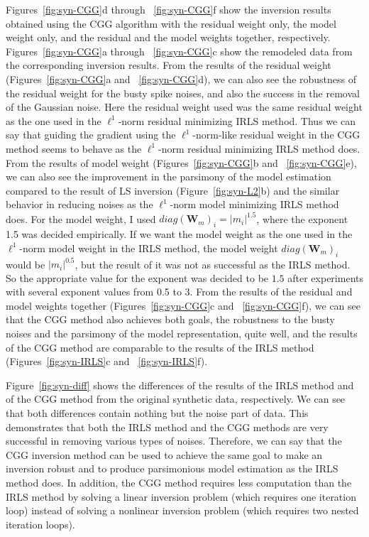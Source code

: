 Figures~\ref{fig:syn-CGG}d through ~\ref{fig:syn-CGG}f show the inversion results 
obtained using the CGG algorithm with the residual weight only,
the model weight only, and the residual and the model weights together, respectively.  
Figures~\ref{fig:syn-CGG}a through ~\ref{fig:syn-CGG}c show the remodeled data 
from the corresponding inversion results.
From the results of the residual weight (Figures~\ref{fig:syn-CGG}a and ~\ref{fig:syn-CGG}d),
we can also see the robustness of the residual weight for the busty spike noises,
and also the success in the removal of the Gaussian noise.
Here the residual weight used was the same residual weight as the one used
in the $\ell^1$-norm residual minimizing IRLS method.
Thus we can say that guiding the gradient using the $\ell^1$-norm-like residual weight 
in the CGG method seems to behave as the $\ell^1$-norm residual minimizing IRLS method does. 
From the results of model weight (Figures~\ref{fig:syn-CGG}b and ~\ref{fig:syn-CGG}e),
we can also see the improvement in the parsimony of the model estimation
compared to the result of LS inversion (Figure~\ref{fig:syn-L2}b)
and the similar behavior in reducing noises as the $\ell^1$-norm model minimizing IRLS method does.
For the model weight, I used $diag({\mathbf W_m})_i = |m_i|^{1.5}$, where the exponent 1.5 was decided empirically.
If we want the model weight as the one used in the $\ell^1$-norm model weight in the IRLS method,
the model weight $diag({\mathbf W_m})_i$ would be $|m_i|^{0.5}$, but the result of it
was not as successful as the IRLS method.
So the appropriate value for the exponent was decided to be $1.5$ 
after experiments with several exponent values from 0.5 to 3.  
From the results of the residual and model weights together 
(Figures~\ref{fig:syn-CGG}c and ~\ref{fig:syn-CGG}f),
we can see that the CGG method also achieves both goals, the robustness to the busty noises
and the parsimony of the model representation, quite well,
and the results of the CGG method are comparable to the results of the IRLS method
(Figures~\ref{fig:syn-IRLS}c and ~\ref{fig:syn-IRLS}f).

Figure~\ref{fig:syn-diff} shows the differences of the results of the IRLS method 
and of the CGG method from the original synthetic data, respectively.
We can see that both differences contain nothing but the noise part of data. 
This demonstrates that both the IRLS method and the CGG methods 
are very successful in removing various types of noises.
Therefore, we can say that the CGG inversion method 
can be used to achieve the same goal to make an inversion robust and
to produce parsimonious model estimation as the IRLS method does.
In addition, the CGG method requires less computation than the IRLS method
by solving a linear inversion problem (which requires one iteration loop)
instead of solving a nonlinear inversion problem (which requires two nested iteration loops).

